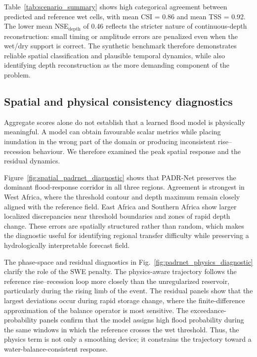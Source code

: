 \documentclass[pdflatex,sn-mathphys-ay]{sn-jnl}
\theoremstyle{thmstyleone}
\begin{document}
Table~\ref{tab:scenario_summary} shows high categorical agreement
between predicted and reference wet cells, with mean CSI = 0.86 and
mean TSS = 0.92.  The lower mean NSE$_\mathrm{depth}$ of 0.46 reflects
the stricter nature of continuous-depth reconstruction: small timing or
amplitude errors are penalized even when the wet/dry support is
correct.  The synthetic benchmark therefore demonstrates reliable
spatial classification and plausible temporal dynamics, while also
identifying depth reconstruction as the more demanding component of the
problem.

\subsection{Spatial and physical consistency diagnostics}
\label{subsec:spatial_physical_results}

Aggregate scores alone do not establish that a learned flood model is
physically meaningful.  A model can obtain favourable scalar metrics
while placing inundation in the wrong part of the domain or producing
inconsistent rise--recession behaviour.  We therefore examined the peak
spatial response and the residual dynamics.

Figure~\ref{fig:spatial_padrnet_diagnostic} shows that PADR-Net
preserves the dominant flood-response corridor in all three regions.
Agreement is strongest in West Africa, where the threshold contour and
depth maximum remain closely aligned with the reference field.  East
Africa and Southern Africa show larger localized discrepancies near
threshold boundaries and zones of rapid depth change.  These errors are
spatially structured rather than random, which makes the diagnostic
useful for identifying regional transfer difficulty while preserving a
hydrologically interpretable forecast field.

The phase-space and residual diagnostics in
Fig.~\ref{fig:padrnet_physics_diagnostic} clarify the role of the SWE
penalty.  The physics-aware trajectory follows the reference
rise--recession loop more closely than the unregularized reservoir,
particularly during the rising limb of the event.  The residual panels
show that the largest deviations occur during rapid storage change,
where the finite-difference approximation of the balance operator is
most sensitive.  The exceedance-probability panels confirm that the
model assigns high flood probability during the same windows in which
the reference crosses the wet threshold.  Thus, the physics term is not
only a smoothing device; it constrains the trajectory toward a
water-balance-consistent response.
\end{document}
